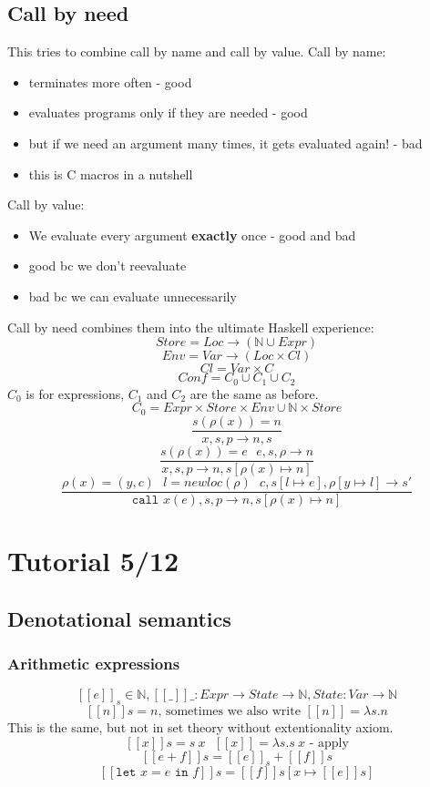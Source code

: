\documentclass{article}
\begin{document}
\subsection{Call by need}
This tries to combine call by name and call by value.
Call by name:
\begin{itemize}
	\item terminates more often - good
	\item evaluates programs only if they are needed - good
	\item but if we need an argument many times, it gets evaluated again! - bad
	\item this is C macros in a nutshell
\end{itemize}
Call by value:
\begin{itemize}
	\item We evaluate every argument \textbf{exactly} once - good and bad
	\item good bc we don't reevaluate
	\item bad bc we can evaluate unnecessarily
\end{itemize}
Call by need combines them into the ultimate Haskell experience:
$$Store=Loc \rightarrow (\mathbb{N}\cup Expr)$$
$$Env=Var \rightarrow (Loc\times Cl)$$
$$Cl=Var\times C$$
$$Conf=C_0\cup C_1\cup C_2$$
$C_0$ is for expressions, $ C_1 $ and $ C_2 $ are the same as before.
$$C_0=Expr\times Store\times Env\cup \mathbb{N}\times Store$$
$$\frac{s(\rho(x))=n}{x,s,p \rightarrow n, s}$$
$$\frac{
	s(\rho(x))=e\ \ \ 
	e,s,\rho \rightarrow n
}{
	x,s,p \rightarrow n,s[\rho(x)\mapsto n]
}$$
$$\frac{
	\rho(x)=(y,c)\ \ \ 
	l=newloc(\rho)\ \ \ 
	c,s[l\mapsto e],\rho[y\mapsto l] \rightarrow s'
}{
	\texttt{call }x(e),s,p \rightarrow n,s[\rho(x)\mapsto n]
}$$

\section{Tutorial 5/12}
\subsection{Denotational semantics}
\subsubsection{Arithmetic expressions}
$$[[e]]_s\in\mathbb{N}, [[\_]]\_:Expr \rightarrow State \rightarrow \mathbb{N}, State: Var \rightarrow \mathbb{N}$$
$$[[n]]s=n \text{, sometimes we also write }[[n]]=\lambda s.n $$
This is the same, but not in set theory without extentionality axiom.
$$[[x]]s=s\ x\ \ \ [[x]]=\lambda s.s\ x \text{ - apply}$$
$$[[e+f]]s=[[e]]_s+[[f]]s$$
$$[[\texttt{let }x=e\texttt{ in }f]]s=[[f]]{s[x\mapsto[[e]]s]}$$
\end{document}
